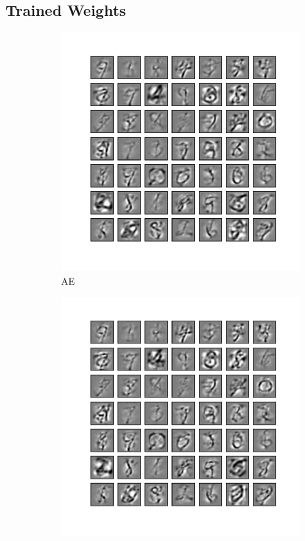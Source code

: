 \subsection{Trained Weights}
\label{subsec:MNIST_weight}
\begin{figure}
	\centering
	\begin{subfigure}[t]{0.4\textwidth}
		\includegraphics[width=\textwidth]{pics_sdlm/22_MNIST_AE/2_60000_0.pdf}
		\caption{AE}
	\end{subfigure}
	\begin{subfigure}[t]{0.4\textwidth}
		\includegraphics[width=\textwidth]{pics_sdlm/23_MNIST_AE_noise/2_60000_0.pdf}

\end{subfigure}
\end{figure}
